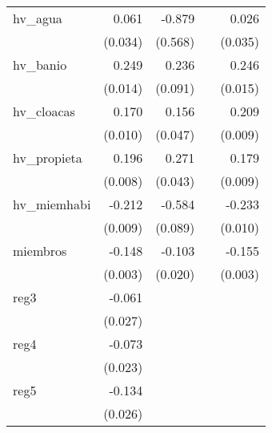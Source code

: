 {\begin{longtable}{l*{4}{D{.}{.}{-1}}}
\addlinespace
hv\_agua     &       0.061         &      -0.879         &                     &       0.026         \\
            &     (0.034)         &     (0.568)         &                     &     (0.035)         \\
\addlinespace
hv\_banio    &       0.249\sym{***}&       0.236\sym{**} &                     &       0.246\sym{***}\\
            &     (0.014)         &     (0.091)         &                     &     (0.015)         \\
\addlinespace
hv\_cloacas  &       0.170\sym{***}&       0.156\sym{***}&                     &       0.209\sym{***}\\
            &     (0.010)         &     (0.047)         &                     &     (0.009)         \\
\addlinespace
hv\_propieta &       0.196\sym{***}&       0.271\sym{***}&                     &       0.179\sym{***}\\
            &     (0.008)         &     (0.043)         &                     &     (0.009)         \\
\addlinespace
hv\_miemhabi &      -0.212\sym{***}&      -0.584\sym{***}&                     &      -0.233\sym{***}\\
            &     (0.009)         &     (0.089)         &                     &     (0.010)         \\
\addlinespace
miembros    &      -0.148\sym{***}&      -0.103\sym{***}&                     &      -0.155\sym{***}\\
            &     (0.003)         &     (0.020)         &                     &     (0.003)         \\
\addlinespace
reg3        &      -0.061\sym{*}  &                     &                     &                     \\
            &     (0.027)         &                     &                     &                     \\
\addlinespace
reg4        &      -0.073\sym{**} &                     &                     &                     \\
            &     (0.023)         &                     &                     &                     \\
\addlinespace
reg5        &      -0.134\sym{***}&                     &                     &                     \\
            &     (0.026)         &                     &                     &                     \\

\end{longtable}}
